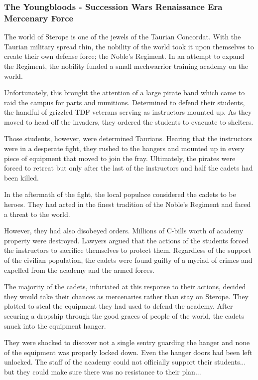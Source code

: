 \subsubsection{The Youngbloods - Succession Wars Renaissance Era Mercenary Force}

The world of Sterope is one of the jewels of the Taurian Concordat.
With the Taurian military spread thin, the nobility of the world took it upon themselves to create their own defense force; the Noble’s Regiment.
In an attempt to expand the Regiment, the nobility funded a small mechwarrior training academy on the world.

Unfortunately, this brought the attention of a large pirate band which came to raid the campus for parts and munitions.
Determined to defend their students, the handful of grizzled TDF veterans serving as instructors mounted up.
As they moved to head off the invaders, they ordered the students to evacuate to shelters.

Those students, however, were determined Taurians.
Hearing that the instructors were in a desperate fight, they rushed to the hangers and mounted up in every piece of equipment that moved to join the fray.
Ultimately, the pirates were forced to retreat but only after the last of the instructors and half the cadets had been killed.

In the aftermath of the fight, the local populace considered the cadets to be heroes.
They had acted in the finest tradition of the Noble’s Regiment and faced a threat to the world.

However, they had also disobeyed orders.
Millions of C-bills worth of academy property were destroyed.
Lawyers argued that the actions of the students forced the instructors to sacrifice themselves to protect them.
Regardless of the support of the civilian population, the cadets were found guilty of a myriad of crimes and expelled from the academy and the armed forces.

The majority of the cadets, infuriated at this response to their actions, decided they would take their chances as mercenaries rather than stay on Sterope.
They plotted to steal the equipment they had used to defend the academy.
After securing a dropship through the good graces of people of the world, the cadets snuck into the equipment hanger.

They were shocked to discover not a single sentry guarding the hanger and none of the equipment was properly locked down. Even the hanger doors had been left unlocked.
The staff of the academy could not officially support their students... but they could make sure there was no resistance to their plan...
          	
